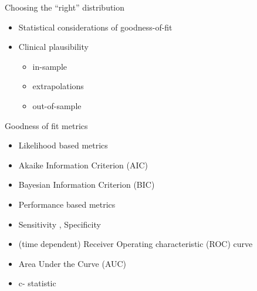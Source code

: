\documentclass[
  ignorenonframetext,
]{beamer}
\providecommand{\tightlist}{%
  \setlength{\itemsep}{0pt}\setlength{\parskip}{0pt}}
\begin{document}
\begin{frame}{Choosing the ``right'' distribution}
\protect\hypertarget{choosing-the-right-distribution}{}

\begin{itemize}
\tightlist
\item
  Statistical considerations of goodness-of-fit
\item
  Clinical plausibility

  \begin{itemize}
  \tightlist
  \item
    in-sample
  \item
    extrapolations
  \item
    out-of-sample
  \end{itemize}
\end{itemize}

\end{frame}

\begin{frame}{Goodness of fit metrics}
\protect\hypertarget{goodness-of-fit-metrics}{}

\begin{itemize}
\item
  Likelihood based metrics
\item
  Akaike Information Criterion (AIC)
\item
  Bayesian Information Criterion (BIC)
\item
  Performance based metrics
\item
  Sensitivity , Specificity
\item
  (time dependent) Receiver Operating characteristic (ROC) curve
\item
  Area Under the Curve (AUC)
\item
  c- statistic
\end{itemize}

\end{frame}
\end{document}
